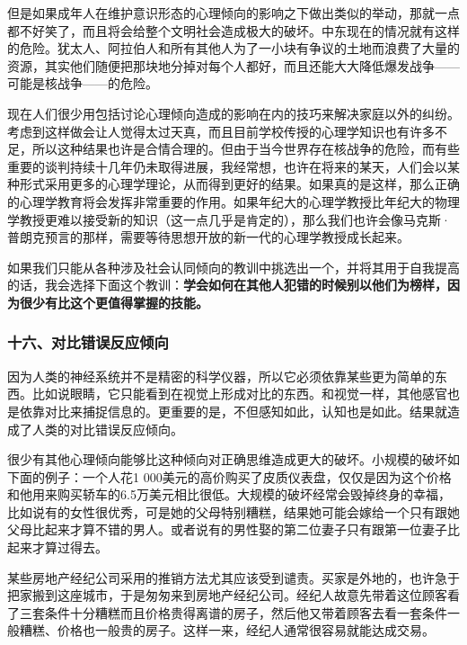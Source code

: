 但是如果成年人在维护意识形态的心理倾向的影响之下做出类似的举动，那就一点都不好笑了，而且将会给整个文明社会造成极大的破坏。中东现在的情况就有这样的危险。犹太人、阿拉伯人和所有其他人为了一小块有争议的土地而浪费了大量的资源，其实他们随便把那块地分掉对每个人都好，而且还能大大降低爆发战争——可能是核战争——的危险。
\par

现在人们很少用包括讨论心理倾向造成的影响在内的技巧来解决家庭以外的纠纷。考虑到这样做会让人觉得太过天真，而且目前学校传授的心理学知识也有许多不足，所以这种结果也许是合情合理的。但由于当今世界存在核战争的危险，而有些重要的谈判持续十几年仍未取得进展，我经常想，也许在将来的某天，人们会以某种形式采用更多的心理学理论，从而得到更好的结果。如果真的是这样，那么正确的心理学教育将会发挥非常重要的作用。如果年纪大的心理学教授比年纪大的物理学教授更难以接受新的知识（这一点几乎是肯定的），那么我们也许会像马克斯·普朗克预言的那样，需要等待思想开放的新一代的心理学教授成长起来。
\par

如果我们只能从各种涉及社会认同倾向的教训中挑选出一个，并将其用于自我提高的话，我会选择下面这个教训：\textbf{学会如何在其他人犯错的时候别以他们为榜样，因为很少有比这个更值得掌握的技能。}
\par

\subsubsection*{十六、对比错误反应倾向}

因为人类的神经系统并不是精密的科学仪器，所以它必须依靠某些更为简单的东西。比如说眼睛，它只能看到在视觉上形成对比的东西。和视觉一样，其他感官也是依靠对比来捕捉信息的。更重要的是，不但感知如此，认知也是如此。结果就造成了人类的对比错误反应倾向。
\par

很少有其他心理倾向能够比这种倾向对正确思维造成更大的破坏。小规模的破坏如下面的例子：一个人花1 000美元的高价购买了皮质仪表盘，仅仅是因为这个价格和他用来购买轿车的6.5万美元相比很低。大规模的破坏经常会毁掉终身的幸福，比如说有的女性很优秀，可是她的父母特别糟糕，结果她可能会嫁给一个只有跟她父母比起来才算不错的男人。或者说有的男性娶的第二位妻子只有跟第一位妻子比起来才算过得去。
\par

某些房地产经纪公司采用的推销方法尤其应该受到谴责。买家是外地的，也许急于把家搬到这座城市，于是匆匆来到房地产经纪公司。经纪人故意先带着这位顾客看了三套条件十分糟糕而且价格贵得离谱的房子，然后他又带着顾客去看一套条件一般糟糕、价格也一般贵的房子。这样一来，经纪人通常很容易就能达成交易。
\par

